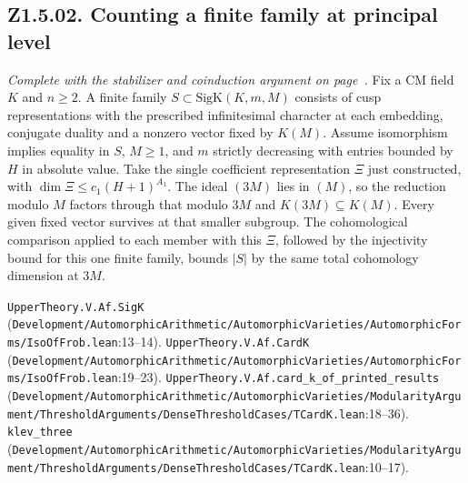 \subsection{Z1.5.02. Counting a finite family at principal level}
\label{r5:small:Z1.5.02}
\textit{Complete with the stabilizer and coinduction argument on page~\pageref{r6:Z1.5.02}.} Fix a CM field $K$ and $n\ge2$. A finite family $S\subset\mathrm{SigK}(K,m,M)$ consists of cusp representations with the prescribed infinitesimal character at each embedding, conjugate duality and a nonzero vector fixed by $K(M)$. Assume isomorphism implies equality in $S$, $M\ge1$, and $m$ strictly decreasing with entries bounded by $H$ in absolute value. Take the single coefficient representation $\Xi$ just constructed, with $\dim\Xi\le c_1(H+1)^{A_1}$. The ideal $(3M)$ lies in $(M)$, so the reduction modulo $M$ factors through that modulo $3M$ and $K(3M)\subseteq K(M)$. Every given fixed vector survives at that smaller subgroup. The cohomological comparison applied to each member with this $\Xi$, followed by the injectivity bound for this one finite family, bounds $|S|$ by the same total cohomology dimension at $3M$.
\par{\footnotesize \nolinkurl{UpperTheory.V.Af.SigK} (\nolinkurl{Development/AutomorphicArithmetic/AutomorphicVarieties/AutomorphicForms/IsoOfFrob.lean}\allowbreak:13--14). \nolinkurl{UpperTheory.V.Af.CardK} (\nolinkurl{Development/AutomorphicArithmetic/AutomorphicVarieties/AutomorphicForms/IsoOfFrob.lean}\allowbreak:19--23). \nolinkurl{UpperTheory.V.Af.card_k_of_printed_results} (\nolinkurl{Development/AutomorphicArithmetic/AutomorphicVarieties/ModularityArgument/ThresholdArguments/DenseThresholdCases/TCardK.lean}\allowbreak:18--36). \nolinkurl{klev_three} (\nolinkurl{Development/AutomorphicArithmetic/AutomorphicVarieties/ModularityArgument/ThresholdArguments/DenseThresholdCases/TCardK.lean}\allowbreak:10--17).\par}

